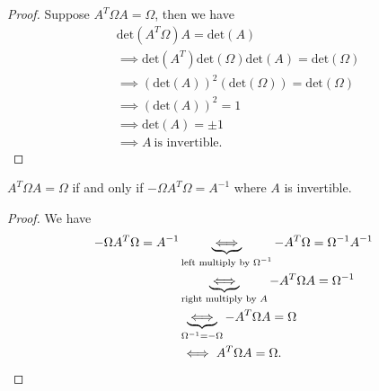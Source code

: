 \begin{proof}
Suppose \( A^{T} \Omega A = \Omega  \), then we have 
\begin{align*}
    &\text{det}(A^{T} \Omega ) A = \text{det}(A)  \\
    &\implies \text{det}(A^{T}) \text{det}(\Omega) \text{det}(A) = \text{det}(\Omega) \\
    &\implies (\text{det}(A))^{2} (\text{det}(\Omega)) = \text{det}(\Omega) \\
    &\implies (\text{det}(A))^{2} = 1  \\
    &\implies \text{det}(A) = \pm 1  \\
    &\implies A \ \text{is invertible}. 
\end{align*}
\end{proof}

\begin{prop}
   \( A^{T} \Omega A = \Omega  \) if and only if \( - \Omega A^{T} \Omega = A^{-1} \) where \( A  \) is invertible.  
\end{prop}
\begin{proof}
We have 
\begin{align*}
    - \Omega A^{T} \Omega = A^{-1} &\underbrace{\iff}_{\text{left multiply by \( \Omega^{-1} \)}} - A^{T} \Omega = \Omega^{-1} A^{-1} \\ 
                                   &\underbrace{\iff}_{\text{right multiply by \( A  \)}} - A^{T} \Omega  A = \Omega^{-1}    \\
                                   &\underbrace{\iff}_{\Omega^{-1} = - \Omega} - A^{T} \Omega A = \Omega \\
                                   &\iff A^{T} \Omega A = \Omega.
\end{align*}
\end{proof}

